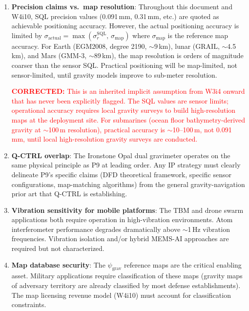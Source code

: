 \documentclass[11pt]{article}
\theoremstyle{definition}
\theoremstyle{remark}
\newcommand{\psigrav}{\psi_{\mathrm{grav}}}
\newcommand{\SQL}{\mathrm{SQL}}
\newcommand{\corrected}[1]{\textcolor{red}{\textbf{CORRECTED:} #1}}
\begin{document}
\begin{enumerate}
\item \textbf{Precision claims vs.\ map resolution}: Throughout this
  document and W4i10, SQL precision values (0.091\,mm, 0.31\,mm, etc.)
  are quoted as achievable positioning accuracy. However, the actual
  positioning accuracy is limited by
  $\sigma_{\mathrm{actual}} = \max(\sigma_r^{\SQL},\,\sigma_{\mathrm{map}})$
  where $\sigma_{\mathrm{map}}$ is the reference map accuracy. For
  Earth (EGM2008, degree 2190, $\sim$9\,km), lunar (GRAIL, $\sim$4.5\,km),
  and Mars (GMM-3, $\sim$89\,km), the map resolution is orders of magnitude
  coarser than the sensor SQL. Practical positioning will be map-limited,
  not sensor-limited, until gravity models improve to sub-meter resolution.

  \corrected{This is an inherited implicit assumption from W3i4 onward
  that has never been explicitly flagged. The SQL values are sensor
  limits; operational accuracy requires local gravity surveys to build
  high-resolution maps at the deployment site. For submarines (ocean
  floor bathymetry-derived gravity at $\sim$100\,m resolution), practical
  accuracy is $\sim$10--100\,m, not 0.091\,mm, until local high-resolution
  gravity surveys are conducted.}

\item \textbf{Q-CTRL overlap}: The Ironstone Opal dual gravimeter
  operates on the same physical principle as P9 at leading order. Any
  IP strategy must clearly delineate P9's specific claims (DFD
  theoretical framework, specific sensor configurations, map-matching
  algorithms) from the general gravity-navigation prior art that Q-CTRL
  is establishing.

\item \textbf{Vibration sensitivity for mobile platforms}: The TBM and
  drone swarm applications both require operation in high-vibration
  environments. Atom interferometer performance degrades dramatically
  above $\sim$1\,Hz vibration frequencies. Vibration isolation and/or
  hybrid MEMS-AI approaches are required but not characterized.

\item \textbf{Map database security}: The $\psigrav$ reference maps are
  the critical enabling asset. Military applications require
  classification of these maps (gravity maps of adversary territory
  are already classified by most defense establishments). The map
  licensing revenue model (W4i10) must account for classification
  constraints.
\end{enumerate}
\end{document}
